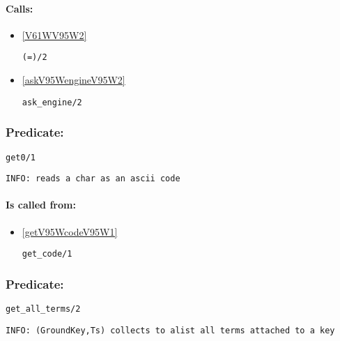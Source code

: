 \paragraph{Calls:} 
\begin{itemize}
\item \ref{V61WV95W2} 
\begin{verbatim}
(=)/2
\end{verbatim}

\item \ref{askV95WengineV95W2} 
\begin{verbatim}
ask_engine/2
\end{verbatim}

\end{itemize}

\subsubsection{Predicate:} \label{get0V95W1}

\begin{verbatim}
get0/1
\end{verbatim}

{\small \begin{verbatim}
INFO: reads a char as an ascii code

\end{verbatim}}
\paragraph{Is called from:} 
\begin{itemize}
\item \ref{getV95WcodeV95W1} 
\begin{verbatim}
get_code/1
\end{verbatim}

\end{itemize}

\subsubsection{Predicate:} \label{getV95WallV95WtermsV95W2}

\begin{verbatim}
get_all_terms/2
\end{verbatim}

{\small \begin{verbatim}
INFO: (GroundKey,Ts) collects to alist all terms attached to a key

\end{verbatim}}
